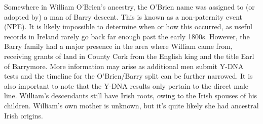 Somewhere in William O'Brien's ancestry, the O'Brien name was assigned to (or adopted by) a man of Barry descent. This is known as a non-paternity event (NPE). It is likely impossible to determine when or how this occurred, as useful records in Ireland rarely go back far enough past the early 1800s. However, the Barry family had a major presence in the area where William came from, receiving grants of land in County Cork from the English king and the title Earl of Barrymore.\cite{BarrymoreDNA:4} More information may arise as additional men submit Y-DNA tests and the timeline for the O'Brien/Barry split can be further narrowed. It is also important to note that the Y-DNA results only pertain to the direct male line. William's descendants still have Irish roots, owing to the Irish spouses of his children. William's own mother is unknown, but it's quite likely she had ancestral Irish origins.
